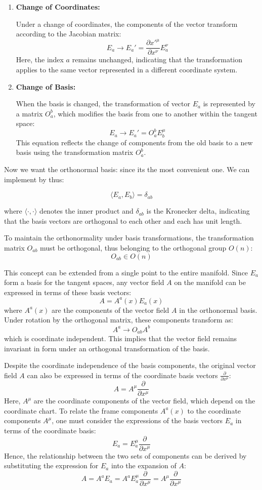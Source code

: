 \documentclass{article}
\begin{document}
\begin{enumerate}
    \item \textbf{Change of Coordinates:}
    
    Under a change of coordinates, the components of the vector transform according to the Jacobian matrix:
    \[
    E_a \to E_a' = \frac{\partial x'^\mu}{\partial x^\nu} E_a^\nu
    \]
    Here, the index $a$ remains unchanged, indicating that the transformation applies to the same vector represented in a different coordinate system.

    \item \textbf{Change of Basis:}
    
    When the basis is changed, the transformation of vector $E_a$ is represented by a matrix $O_a^b$, which modifies the basis from one to another within the tangent space:
    \[
    E_a \to E_a' = O_a^b E_b^\mu
    \]
    This equation reflects the change of components from the old basis to a new basis using the transformation matrix $O_a^b$.
\end{enumerate}

Now we want the orthonormal basis: since its the most convenient one. We can implement by thus: 

\[ \langle E_a, E_b \rangle = \delta_{ab} \]

where $\langle \cdot, \cdot \rangle$ denotes the inner product and $\delta_{ab}$ is the Kronecker delta, indicating that the basis vectors are orthogonal to each other and each has unit length.

To maintain the orthonormality under basis transformations, the transformation matrix $O_{ab}$ must be orthogonal, thus belonging to the orthogonal group $O(n)$:
\[
O_{ab} \in O(n)
\]

This concept can be extended from a single point to the entire manifold. Since $E_a$ form a basis for the tangent spaces, any vector field $A$ on the manifold can be expressed in terms of these basis vectors:
\[
A = A^a(x) E_a(x)
\]
where $A^a(x)$ are the components of the vector field $A$ in the orthonormal basis. Under rotation by the orthogonal matrix, these components transform as:
\[
A^a \to O_{ab} A^b
\]
which is coordinate independent. This implies that the vector field remains invariant in form under an orthogonal transformation of the basis.

Despite the coordinate independence of the basis components, the original vector field $A$ can also be expressed in terms of the coordinate basis vectors $\frac{\partial}{\partial x^\mu}$:
\[
A = A^\mu \frac{\partial}{\partial x^\mu}
\]
Here, $A^\mu$ are the coordinate components of the vector field, which depend on the coordinate chart. To relate the frame components $A^a(x)$ to the coordinate components $A^\mu$, one must consider the expressions of the basis vectors $E_a$ in terms of the coordinate basis:
\[
E_a = E_a^\mu \frac{\partial}{\partial x^\mu}
\]
Hence, the relationship between the two sets of components can be derived by substituting the expression for $E_a$ into the expansion of $A$:
\[
A = A^a E_a = A^a E_a^\mu \frac{\partial}{\partial x^\mu} = A^\mu \frac{\partial}{\partial x^\mu} 
\]
\end{document}
